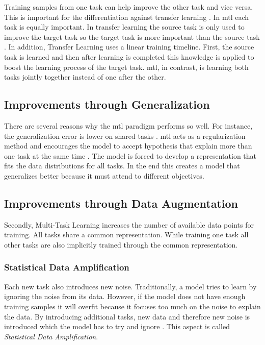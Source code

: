 Training samples from one task can help improve the other task and vice versa. This is important for the differentiation against transfer learning \cite{Pratt1993}. In \gls{mtl} each task is equally important. In transfer learning the source task is only used to improve the target task so the target task is more important than the source task \cite{Zhang2017a}. In addition, Transfer Learning uses a linear training timeline. First, the source task is learned and then after learning is completed this knowledge is applied to boost the learning process of the target task. \gls{mtl}, in contrast, is learning both tasks jointly together instead of one after the other.


\subsection{Improvements through Generalization}
\label{sec:03_mtlAdvantages}

There are several reasons why the \gls{mtl} paradigm performs so well. For instance, the generalization error is lower on shared tasks \cite{Caruana1993}. \gls{mtl} acts as a regularization method and encourages the model to accept hypothesis that explain more than one task at the same time \cite{Ruder2017}. The model is forced to develop a representation that fits the data distributions for all tasks. In the end this creates a model that generalizes better because it must attend to different objectives.

\subsection{Improvements through Data Augmentation}

Secondly, Multi-Task Learning increases the number of available data points for training. All tasks share a common representation. While training one task all other tasks are also implicitly trained through the common representation.

\subsubsection*{Statistical Data Amplification}

Each new task also introduces new noise. Traditionally, a model tries to learn by ignoring the noise from its data. However, if the model does not have enough training samples it will overfit because it focuses too much on the noise to explain the data. By introducing additional tasks, new data and therefore new noise is introduced which the model has to try and ignore \cite{Ruder2017}. This aspect is called \textit{Statistical Data Amplification}\cite{Caruana1995a}.

